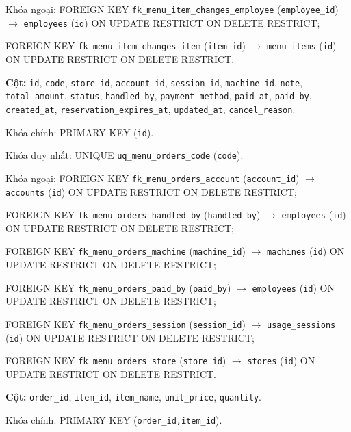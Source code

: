 \begin{description}[leftmargin=3.6cm,labelwidth=3.4cm,style=nextline]
Khóa ngoại: FOREIGN KEY \texttt{fk\_menu\_item\_changes\_employee} (\texttt{employee\_id}) $\rightarrow$ \texttt{employees} (\texttt{id}) ON UPDATE RESTRICT ON DELETE RESTRICT;\par FOREIGN KEY \texttt{fk\_menu\_item\_changes\_item} (\texttt{item\_id}) $\rightarrow$ \texttt{menu\_items} (\texttt{id}) ON UPDATE RESTRICT ON DELETE RESTRICT.

\item[\texttt{menu\_orders}] \textbf{Cột:} \texttt{id}, \texttt{code}, \texttt{store\_id}, \texttt{account\_id}, \texttt{session\_id}, \texttt{machine\_id}, \texttt{note}, \texttt{total\_amount}, \texttt{status}, \texttt{handled\_by}, \texttt{payment\_method}, \texttt{paid\_at}, \texttt{paid\_by}, \texttt{created\_at}, \texttt{reservation\_expires\_at}, \texttt{updated\_at}, \texttt{cancel\_reason}.

Khóa chính: PRIMARY KEY (\texttt{id}).

Khóa duy nhất: UNIQUE \texttt{uq\_menu\_orders\_code} (\texttt{code}).

Khóa ngoại: FOREIGN KEY \texttt{fk\_menu\_orders\_account} (\texttt{account\_id}) $\rightarrow$ \texttt{accounts} (\texttt{id}) ON UPDATE RESTRICT ON DELETE RESTRICT;\par FOREIGN KEY \texttt{fk\_menu\_orders\_handled\_by} (\texttt{handled\_by}) $\rightarrow$ \texttt{employees} (\texttt{id}) ON UPDATE RESTRICT ON DELETE RESTRICT;\par FOREIGN KEY \texttt{fk\_menu\_orders\_machine} (\texttt{machine\_id}) $\rightarrow$ \texttt{machines} (\texttt{id}) ON UPDATE RESTRICT ON DELETE RESTRICT;\par FOREIGN KEY \texttt{fk\_menu\_orders\_paid\_by} (\texttt{paid\_by}) $\rightarrow$ \texttt{employees} (\texttt{id}) ON UPDATE RESTRICT ON DELETE RESTRICT;\par FOREIGN KEY \texttt{fk\_menu\_orders\_session} (\texttt{session\_id}) $\rightarrow$ \texttt{usage\_sessions} (\texttt{id}) ON UPDATE RESTRICT ON DELETE RESTRICT;\par FOREIGN KEY \texttt{fk\_menu\_orders\_store} (\texttt{store\_id}) $\rightarrow$ \texttt{stores} (\texttt{id}) ON UPDATE RESTRICT ON DELETE RESTRICT.

\item[\texttt{menu\_order\_items}] \textbf{Cột:} \texttt{order\_id}, \texttt{item\_id}, \texttt{item\_name}, \texttt{unit\_price}, \texttt{quantity}.

Khóa chính: PRIMARY KEY (\texttt{order\_id,item\_id}).


\end{description}
